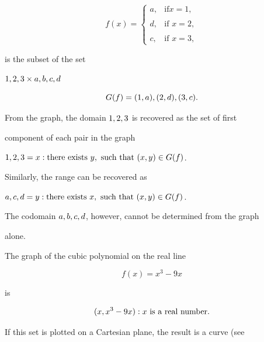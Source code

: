 $$f(x)=

\begin{cases} a, & \text{if}x=1, \\\\ d, & \text{if }x=2, \\\\ c, & \text{if }x=3, \end{cases}$$ 

is the subset of the set

$\\{1,2,3\\} \times \\{a,b,c,d\\}$ 

$$G(f) = \\{ (1,a), (2,d), (3,c) \\}.$$



From the graph, the domain $\\{1,2,3\\}$ is recovered as the set of first

component of each pair in the graph

$\\{1,2,3\\} = \\{x : \text{there exists } y,\text{ such that }(x,y) \in G(f)\\}$.

Similarly, the range can be recovered as

$\\{a,c,d\\} = \\{y : \text{there exists }x,\text{ such that }(x,y)\in G(f)\\}$.

The codomain $\\{a,b,c,d\\}$, however, cannot be determined from the graph

alone.



The graph of the cubic polynomial on the real line 

$$f(x) = x^3 - 9x$$ 

is

$$\\{ (x, x^3 - 9x) : x \text{ is a real number} \\}.$$



If this set is plotted on a Cartesian plane, the result is a curve (see

